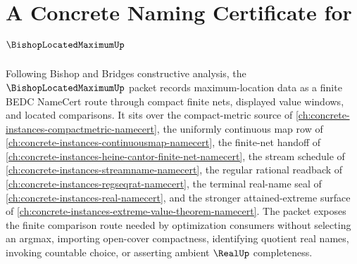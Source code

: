 \chapter{A Concrete Naming Certificate for $\BishopLocatedMaximumUp$}
\label{ch:concrete-instances-bishop-located-maximum-namecert}

Following Bishop and Bridges constructive analysis, the $\BishopLocatedMaximumUp$ packet records maximum-location data as a finite BEDC NameCert route through compact finite nets, displayed value windows, and located comparisons. It sits over the compact-metric source of \autoref{ch:concrete-instances-compactmetric-namecert}, the uniformly continuous map row of \autoref{ch:concrete-instances-continuousmap-namecert}, the finite-net handoff of \autoref{ch:concrete-instances-heine-cantor-finite-net-namecert}, the stream schedule of \autoref{ch:concrete-instances-streamname-namecert}, the regular rational readback of \autoref{ch:concrete-instances-regseqrat-namecert}, the terminal real-name seal of \autoref{ch:concrete-instances-real-namecert}, and the stronger attained-extreme surface of \autoref{ch:concrete-instances-extreme-value-theorem-namecert}. The packet exposes the finite comparison route needed by optimization consumers without selecting an argmax, importing open-cover compactness, identifying quotient real names, invoking countable choice, or asserting ambient $\RealUp$ completeness.

